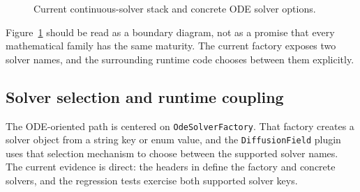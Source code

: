 \begin{figure}[htbp]
\centering
\caption{Current continuous-solver stack and concrete ODE solver options.}
\label{fig:continuous-ode-flow}
\end{figure}

Figure~\ref{fig:continuous-ode-flow} should be read as a boundary diagram, not
as a promise that every mathematical family has the same maturity. The current
factory exposes two solver names, and the surrounding runtime code chooses
between them explicitly.

\subsection{Solver selection and runtime coupling}
\label{subsec:continuous-solver-selection}

The ODE-oriented path is centered on \texttt{OdeSolverFactory}. That factory
creates a solver object from a string key or enum value, and the
\texttt{DiffusionField} plugin uses that selection mechanism to choose between
the supported solver names. The current evidence is direct: the headers in
 define the factory and concrete solvers, and the
regression tests exercise both supported solver keys.

